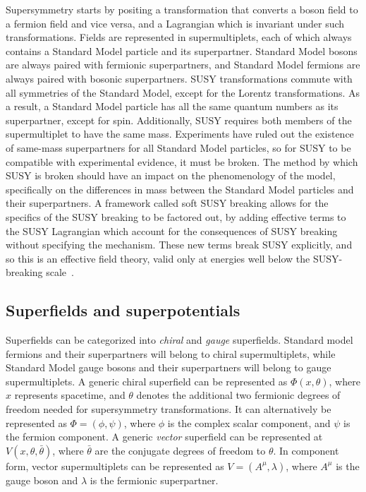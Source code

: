 Supersymmetry starts by positing a transformation that converts a boson field to a fermion field and vice versa, and a Lagrangian which is invariant under such transformations.
Fields are represented in supermultiplets, each of which always contains a Standard Model particle and its superpartner.
Standard Model bosons are always paired with fermionic superpartners, and Standard Model fermions are always paired with bosonic superpartners.
SUSY transformations commute with all symmetries of the Standard Model, except for the Lorentz transformations.
As a result, a Standard Model particle has all the same quantum numbers as its superpartner, except for spin.
Additionally, SUSY requires both members of the supermultiplet to have the same mass.
Experiments have ruled out the existence of same-mass superpartners for all Standard Model particles, so for SUSY to be compatible with experimental evidence, it must be broken.
The method by which SUSY is broken should have an impact on the phenomenology of the model, specifically on the differences in mass between the Standard Model particles and their superpartners.
A framework called soft SUSY breaking allows for the specifics of the SUSY breaking to be factored out, by adding effective terms to the SUSY Lagrangian which account for the consequences of SUSY breaking without specifying the mechanism.
These new terms break SUSY explicitly, and so this is an effective field theory, valid only at energies well below the SUSY-breaking scale~\cite{susy-soft-1981}.

\subsection{Superfields and superpotentials}\label{subsec:susy_superfields}
Superfields can be categorized into \textit{chiral} and \textit{gauge} superfields.
Standard model fermions and their superpartners will belong to chiral supermultiplets, while Standard Model gauge bosons and their superpartners will belong to gauge supermultiplets.
A generic chiral superfield can be represented as $\Phi(x, \theta)$, where $x$ represents spacetime, and $\theta$ denotes the additional two fermionic degrees of freedom needed for supersymmetry transformations.
It can alternatively be represented as $\Phi = \left(\phi, \psi \right)$, where $\phi$ is the complex scalar component, and $\psi$ is the fermion component.
A generic \textit{vector} superfield can be represented at $V(x, \theta, \bar{\theta})$, where $\bar{\theta}$ are the conjugate degrees of freedom to $\theta$.
In component form, vector supermultiplets can be represented as $V = \left(A^{\mu}, \lambda\right)$, where $A^{\mu}$ is the gauge boson and $\lambda$ is the fermionic superpartner.

